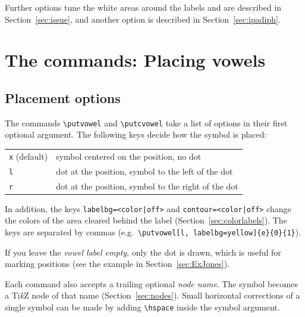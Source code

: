 \documentclass[a4paper,11pt]{article}
\newcommand\cmd[1]{\texttt{\textbackslash #1}}
\newcommand\opt[1]{\texttt{#1}}
\begin{document}
\noindent
Further options tune the white areas around the labels and are described in Section~\ref{sec:issue}, and another option is described in Section~\ref{sec:ipadiph}.




\section{The commands: Placing vowels} \label{sec:Commands}

\subsection{Placement options} \label{sec:placement}

The commands \cmd{putvowel} and \cmd{putcvowel} take a list of options in their first optional argument. The following keys decide how the symbol is placed:

\begin{center}
	\begin{tabular}{@{}ll@{}}
		\toprule
		\texttt{x} (default) & symbol centered on the position, no dot\\
		\texttt{l} & dot at the position, symbol to the left of the dot\\
		\texttt{r} & dot at the position, symbol to the right of the dot\\
		\bottomrule
	\end{tabular}
\end{center}

\noindent
In addition, the keys \opt{labelbg=<color|off>} and \opt{contour=<color|off>} change the colors of the area cleared behind the label (Section~\ref{sec:colorlabels}). The keys are separated by commas (e.g.\ \cmd{putvowel}\texttt{[l, labelbg=\allowbreak yellow]\allowbreak \{e\}\{0\}\{1\}}).

If you leave the \emph{vowel label empty}, only the dot is drawn, which is useful for marking positions (see the example in Section~\ref{sec:ExJones}).

Each command also accepts a trailing optional \emph{node name}. The symbol
becomes a Ti\textit{k}Z node of that name (Section~\ref{sec:nodes}).
Small horizontal corrections of a single symbol can be made by adding
\cmd{hspace} inside the symbol argument.
\end{document}
